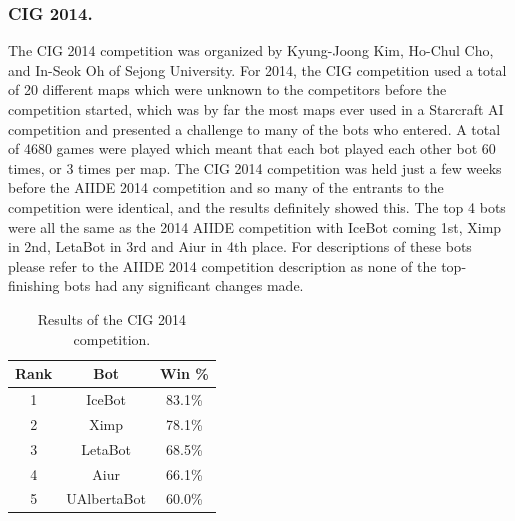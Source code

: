 \documentclass{llncs}
\begin{document}
\subsubsection{CIG 2014.}
The CIG 2014 competition was organized by Kyung-Joong Kim, Ho-Chul Cho, and In-Seok Oh of Sejong University. For 2014, the CIG competition used a total of 20 different maps which were unknown to the competitors before the competition started, which was by far the most maps ever used in a Starcraft AI competition and presented a challenge to many of the bots who entered. A total of 4680 games were played which meant that each bot played each other bot 60 times, or 3 times per map. The CIG 2014 competition was held just a few weeks before the AIIDE 2014 competition and so many of the entrants to the competition were identical, and the results definitely showed this. The top 4 bots were all the same as the 2014 AIIDE competition with IceBot coming 1st, Ximp in 2nd, LetaBot in 3rd and Aiur in 4th place. For descriptions of these bots please refer to the AIIDE 2014 competition description as none of the top-finishing bots had any significant changes made.

\begin{table}[t]
\caption{Results of the CIG 2014 competition.}
\label{tab:cig2014}
\centering
\begin{tabular}{|c|c|c|}
\hline
{\bfseries Rank} & {\bfseries Bot} & {\bfseries Win \%} \\
\hline
1 & IceBot & 83.1\% \\
2 & Ximp & 78.1\% \\
3 & LetaBot & 68.5\% \\
4 & Aiur & 66.1\% \\
5 & UAlbertaBot & 60.0\% \\ 
\hline
\end{tabular}
\end{table}
\end{document}
